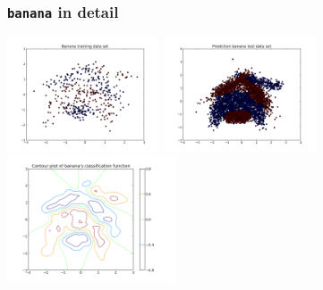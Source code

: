 \begin{frame}
	\frametitle{\texttt{banana} in detail}
	\begin{center}
		\includegraphics[width=4.5cm]{images/banana_training.png}
		\includegraphics[width=4.5cm]{images/banana_prediction.png}
		\\
		\includegraphics[width=5cm]{images/banana_function.png}
	\end{center}
\end{frame}

